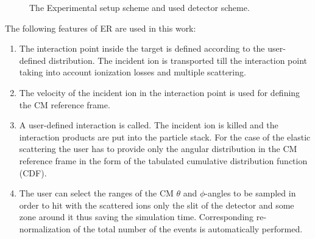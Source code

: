 \documentclass[%
 aip,
cp,  %
 amsmath,amssymb,%
 reprint,%
]{revtex4-2}
\begin{document}
\begin{figure}[h]
\caption{The Experimental setup scheme and used detector scheme.}
\label{ris:fig1}
\end{figure}


The following features of ER are used in this work:
\begin{enumerate}
\item The interaction point inside the target is defined according to the user-defined distribution. The incident ion is transported till the interaction point taking into account ionization losses and multiple scattering.
\item The velocity of the incident ion in the interaction point is used for defining the CM reference frame.
\item A user-defined interaction is called. The incident ion is killed and the interaction products are put into the particle stack. For the case of the elastic scattering the user has to provide only the angular distribution in the CM reference frame in the form of the tabulated cumulative distribution function (CDF).
\item The user can select the ranges of the CM $\theta$ and $\phi$-angles to be sampled in order to hit with the scattered ions only the slit of the detector and some zone around it thus saving the simulation time.  Corresponding re-normalization of the total number of the events is automatically performed.
\end{enumerate}
\end{document}
